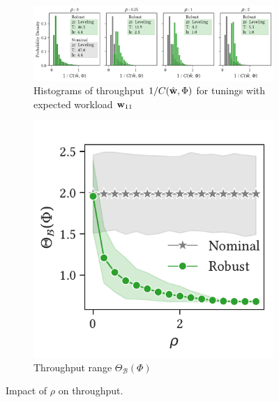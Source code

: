 \begin{figure}[htbp]
    \centering
    \begin{subfigure}[h]{0.74\textwidth}
        \includegraphics[scale=0.5]{figures/overlapping_histogram.pdf}
        \caption{Histograms of throughput $1 / C({{\hat{\bf{w}}}}, \Phi)$ for
            tunings with expected workload ${{\bf{w}}}_{11}$ }
        \label{fig:overlapping_histogram}
    \end{subfigure}
    \begin{subfigure}[h]{0.24\textwidth} 
        \includegraphics[scale=0.5]{figures/throughput_range_evolution.pdf}
        \caption{Throughput range $\Theta_{\mathcal{B}}(\Phi)$}
        \label{fig:throughput_range_evolution}
    \end{subfigure}
    \caption{Impact of $\rho$ on throughput.}
    \label{fig:rho_throughput_range_impact}
\end{figure}

